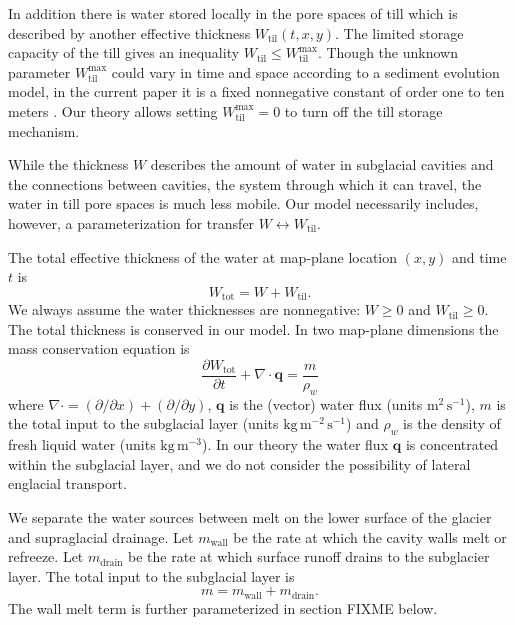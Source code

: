 \documentclass[11pt,final]{amsart}
\newcommand\bq{\mathbf{q}}
\newcommand{\Div}{\nabla\cdot}
\newcommand{\Wtil}{W_{\text{til}}}
\newcommand{\Wtilmax}{W_{\text{til}}^{\text{max}}}
\newcommand{\Wtot}{W_{\text{tot}}}
\begin{document}
In addition there is water stored locally in the pore spaces of till \citep{Tulaczyketal2000b} which is described by another effective thickness $\Wtil(t,x,y)$.  The limited storage capacity of the till gives an inequality $\Wtil \le \Wtilmax$.  Though the unknown parameter $\Wtilmax$ could vary in time and space according to a sediment evolution model, in the current paper it is a fixed nonnegative constant of order one to ten meters \citep{BBssasliding,TrufferEchelmeyerHarrison}.  Our theory allows setting $\Wtilmax=0$ to turn off the till storage mechanism.

While the thickness $W$ describes the amount of water in subglacial cavities and the connections between cavities, the system through which it can travel, the water in till pore spaces is much less mobile.  Our model necessarily includes, however, a parameterization for transfer $W \leftrightarrow \Wtil$.

The total effective thickness of the water at map-plane location $(x,y)$ and time $t$ is
\begin{equation}
\Wtot = W + \Wtil.  \label{eq:totalwater}
\end{equation}
We always assume the water thicknesses are nonnegative: $W \ge 0$ and $\Wtil \ge 0$.  The total thickness is conserved in our model.  In two map-plane dimensions the mass conservation equation is \citep{Clarke05}
\begin{equation} \label{eq:conserve}
\frac{\partial \Wtot}{\partial t} + \Div \bq = \frac{m}{\rho_w}
\end{equation}
where $\Div = (\partial/\partial x) + (\partial/\partial y)$, $\bq$ is the (vector) water flux (units $\text{m}^2\,\text{s}^{-1}$), $m$ is the total input to the subglacial layer (units $\text{kg}\,\text{m}^{-2}\,\text{s}^{-1}$) and $\rho_w$ is the density of fresh liquid water (units $\text{kg}\,\text{m}^{-3}$).  In our theory the water flux $\bq$ is concentrated within the subglacial layer, and we do not consider the possibility of lateral englacial transport.

We separate the water sources between melt on the lower surface of the glacier and supraglacial drainage.  Let $m_{\text{wall}}$ be the rate at which the cavity walls melt or refreeze.  Let $m_{\text{drain}}$ be the rate at which surface runoff drains to the subglacier layer.  The total input to the subglacial layer is
\begin{equation}
m = m_{\text{wall}} + m_{\text{drain}}. \label{eq:totalinput}
\end{equation}
The wall melt term is further parameterized in section FIXME below.
\end{document}

